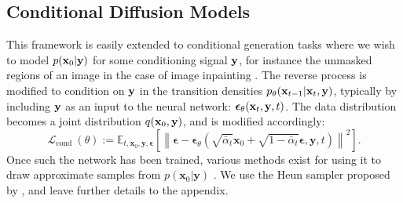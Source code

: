 \subsection{Conditional Diffusion Models}
This framework is easily extended to conditional generation tasks where we wish to model $p(\mathbf{x}_0|\mathbf{y})$ for some conditioning signal $\mathbf{y}$, for instance the unmasked regions of an image in the case of image inpainting \citep{palette}. The reverse process is modified to condition on $\mathbf{y}$ in the transition densities $p_\theta(\mathbf{x}_{t-1}|\mathbf{x}_t, \mathbf{y})$, typically by including $\mathbf{y}$ as an input to the neural network: $\boldsymbol{\epsilon}_\theta(\mathbf{x}_t, \mathbf{y}, t)$. The data distribution becomes a joint distribution $q(\mathbf{x}_0, \mathbf{y})$, and  is modified accordingly:		
\begin{equation}
    \mathcal{L}_{\text {cond }}(\theta):=\mathbb{E}_{t, \mathbf{x}_0, \mathbf{y}, \boldsymbol{\epsilon}}\left[\left\|\boldsymbol{\epsilon}-\boldsymbol{\epsilon}_\theta\left(\sqrt{\bar{\alpha}_t} \mathbf{x}_0+\sqrt{1-\bar{\alpha}_t} \boldsymbol{\epsilon}, \mathbf{y}, t\right)\right\|^2\right].
    \label{eq:lcond}
\end{equation}
Once such the network has been trained, various methods exist for using it to draw approximate samples from $p(\mathbf{x}_0|\mathbf{y})$ \citep{ddpm,sohldickstein,tashiro2021csdi,song2020score,karras2022elucidating}. We use the Heun sampler proposed by \citet{karras2022elucidating}, and leave further details to the appendix.

